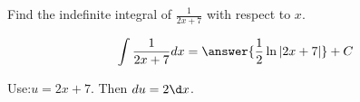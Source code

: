 \documentclass{ximera}
\author{Gregory Hartman \and Matthew Carr\and Nela Lakos}
\begin{document}
\begin{exercise}

Find the indefinite integral of $\frac{1}{2x+7}$ with respect to $x$.

\[
\int \frac{1}{2x+7} dx=\answer{\frac{1}{2}\ln|2x+7|}+C
\]
\begin{hint}
Use:$ u=2x+7$. Then $du=2\d x$.
\end{hint}
\end{exercise}
\end{document}
